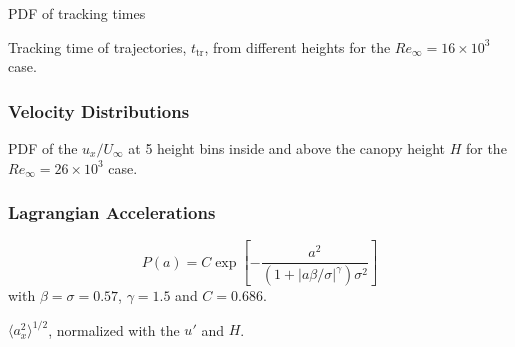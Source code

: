 \documentclass[aspectratio=43]{beamer}
\begin{document}
\begin{frame}[label=result-4]{PDF of tracking times}
\centering {}
\begin{cardTiny} Tracking time of trajectories, $t_\text{tr}$, from different heights for the  $Re_\infty=16\times10^3$ case. \end{cardTiny} 
\end{frame}


\subsubsection*{Velocity Distributions}
\begin{frame}[label=result-1]
	\centering
	\vspace{-.3cm}
	\begin{cardTiny} PDF of the $u_x/U_\infty$ at 5 height bins inside and above the canopy height $H$ for the $Re_\infty = 26\times 10^3$ case. 
	\end{cardTiny}
\end{frame}


\subsubsection*{Lagrangian Accelerations}

\begin{frame}[label=result-2]
\centering{}
\begin{cardTiny} %
\begin{equation}
P(a) = C \exp \left[- \frac{a^2}{\left( 1 + |a\beta / \sigma|^\gamma   \right) \sigma^2} \right]
\label{eq:stretched_exp}
\end{equation}
with $\beta=\sigma=0.57$, $\gamma=1.5$ and $C = 0.686$. 
\end{cardTiny}
\end{frame}


\begin{frame}[label=result-3]
\centering{}
\begin{cardTiny} $\langle a_x^2 \rangle^{1/2}$, normalized with the $u'$ and $H$.\end{cardTiny}
%
\end{frame}

%
\end{document}
